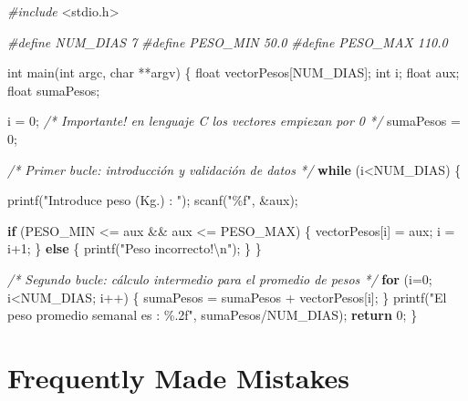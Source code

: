 \documentclass[
]{book}
\newenvironment{Shaded}{\begin{snugshade}}{\end{snugshade}}
\newcommand{\CommentTok}[1]{\textcolor[rgb]{0.56,0.35,0.01}{\textit{#1}}}
\newcommand{\ControlFlowTok}[1]{\textcolor[rgb]{0.13,0.29,0.53}{\textbf{#1}}}
\newcommand{\DataTypeTok}[1]{\textcolor[rgb]{0.13,0.29,0.53}{#1}}
\newcommand{\DecValTok}[1]{\textcolor[rgb]{0.00,0.00,0.81}{#1}}
\newcommand{\ImportTok}[1]{#1}
\newcommand{\NormalTok}[1]{#1}
\newcommand{\PreprocessorTok}[1]{\textcolor[rgb]{0.56,0.35,0.01}{\textit{#1}}}
\newcommand{\SpecialCharTok}[1]{\textcolor[rgb]{0.00,0.00,0.00}{#1}}
\newcommand{\StringTok}[1]{\textcolor[rgb]{0.31,0.60,0.02}{#1}}
\begin{document}
\begin{Shaded}
\begin{Highlighting}[]
\PreprocessorTok{\#include }\ImportTok{\textless{}stdio.h\textgreater{}}

\PreprocessorTok{\#define NUM\_DIAS 7}
\PreprocessorTok{\#define PESO\_MIN 50.0}
\PreprocessorTok{\#define PESO\_MAX 110.0}

\DataTypeTok{int}\NormalTok{ main(}\DataTypeTok{int}\NormalTok{ argc, }\DataTypeTok{char}\NormalTok{ **argv) \{}
    \DataTypeTok{float}\NormalTok{ vectorPesos[NUM\_DIAS];}
    \DataTypeTok{int}\NormalTok{ i;}
    \DataTypeTok{float}\NormalTok{ aux;}
    \DataTypeTok{float}\NormalTok{ sumaPesos;}

\NormalTok{    i = }\DecValTok{0}\NormalTok{; }\CommentTok{/* Importante! en lenguaje C los vectores empiezan por 0 */}
\NormalTok{    sumaPesos = }\DecValTok{0}\NormalTok{;}

    \CommentTok{/* Primer bucle: introducción y validación de datos */}
    \ControlFlowTok{while}\NormalTok{ (i\textless{}NUM\_DIAS) \{}

\NormalTok{        printf(}\StringTok{"Introduce peso (Kg.) : "}\NormalTok{);}
\NormalTok{        scanf(}\StringTok{"\%f"}\NormalTok{, \&aux);}

        \ControlFlowTok{if}\NormalTok{ (PESO\_MIN \textless{}= aux \&\& aux \textless{}= PESO\_MAX) \{}
\NormalTok{            vectorPesos[i] = aux;}
\NormalTok{            i = i+}\DecValTok{1}\NormalTok{;}
\NormalTok{        \} }\ControlFlowTok{else}\NormalTok{ \{}
\NormalTok{            printf(}\StringTok{"Peso incorrecto!}\SpecialCharTok{\textbackslash{}n}\StringTok{"}\NormalTok{);}
\NormalTok{        \}}
\NormalTok{    \}}

    \CommentTok{/* Segundo bucle: cálculo intermedio para el promedio de pesos */}
    \ControlFlowTok{for}\NormalTok{ (i=}\DecValTok{0}\NormalTok{; i\textless{}NUM\_DIAS; i++) \{}
\NormalTok{        sumaPesos = sumaPesos + vectorPesos[i];}
\NormalTok{    \}}
\NormalTok{    printf(}\StringTok{"El peso promedio semanal es : \%.2f"}\NormalTok{, sumaPesos/NUM\_DIAS);}
    \ControlFlowTok{return} \DecValTok{0}\NormalTok{;}
\NormalTok{\}}
\end{Highlighting}
\end{Shaded}

\hypertarget{frequently-made-mistakes-3}{%
\section{Frequently Made Mistakes}\label{frequently-made-mistakes-3}}
\end{document}
